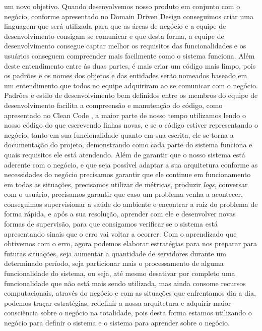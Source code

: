     um novo objetivo. \newline
    Quando desenvolvemos nosso produto em conjunto com o negócio, conforme apresentado
    no Domain Driven Design \cite{DomainDrivenDesign} conseguimos criar uma linguagem
    que será utilizada para que as áreas de negócio e a equipe de desenvolvimento
    consigam se comunicar e que desta forma, a equipe de desenvolvimento consegue
    captar melhor os requisitos das funcionalidades e os usuários conseguem
    compreender mais facilmente como o sistema funciona. Além deste entendimento
    entre às duas partes, é mais criar um código mais limpo, pois os padrões e os
    nomes dos objetos e das entidades serão nomeados baseado em um entendimento
    que todos no equipe adquiriram ao se comunicar com o negócio. Padrões e estilo de
    desenvolvimento bem definidos entre os membros do equipe de desenvolvimento facilita
    a compreensão e manutenção do código, como apresentado no Clean Code \cite{CleanCode},
    a maior parte de nosso tempo utilizamos lendo o nosso código do que escrevendo
    linhas novas, e se o código estiver representando o negócio, tanto em sua
    funcionalidade quanto em sua escrita, ele se torna a documentação do projeto,
    demonstrando como cada parte do sistema funciona e quais requisitos ele está
    atendendo. \newline
    Além de garantir que o nosso sistema está aderente com o negócio, e que seja
    possível adaptar a sua arquitetura conforme as necessidades do negócio precisamos
    garantir que ele continue em funcionamento em todas as situações,
    precisamos utilizar de métricas, produzir \textit{logs}, conversar com o usuário,
    precisamos garantir que caso um problema venha a acontecer, conseguimos supervisionar
    a saúde do ambiente e encontrar a raiz do problema de forma rápida, e após a
    sua resolução, aprender com ele e desenvolver novas formas de supervisão, para
    que consigamos verificar se o sistema está apresentando sinais que o erro vai
    voltar a ocorrer. Com o aprendizado que obtivemos com o erro, agora podemos
    elaborar estratégias para nos preparar para futuras situações, seja aumentar
    a quantidade de servidores durante um determinado período, seja particionar
    mais o processamento de alguma funcionalidade do sistema, ou seja, até mesmo
    desativar por completo uma funcionalidade que não está mais sendo utilizada,
    mas ainda consome recursos computacionais, através do negócio e com as situações
    que enfrentamos dia a dia, podemos traçar estratégias, redefinir a nossa
    arquitetura e adquirir maior consciência sobre o negócio na totalidade, pois
    desta forma estamos utilizando o negócio para definir o sistema e o sistema
    para aprender sobre o negócio.
